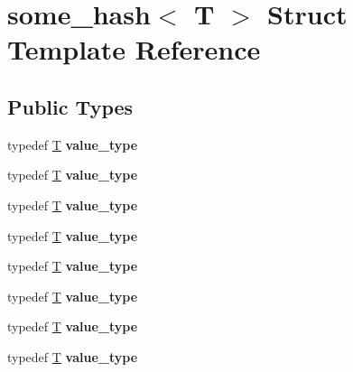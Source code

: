 \hypertarget{structsome__hash}{}\section{some\+\_\+hash$<$ T $>$ Struct Template Reference}
\label{structsome__hash}
\subsection*{Public Types}
\begin{DoxyCompactItemize}
\item 
\mbox{\label{structsome__hash_a4e2d8cd22f7cca04af3fa2c2e0dd1509}} 
typedef \mbox{\hyperlink{struct_t}{T}} {\bfseries value\+\_\+type}
\item 
\mbox{\label{structsome__hash_a4e2d8cd22f7cca04af3fa2c2e0dd1509}} 
typedef \mbox{\hyperlink{struct_t}{T}} {\bfseries value\+\_\+type}
\item 
\mbox{\label{structsome__hash_a4e2d8cd22f7cca04af3fa2c2e0dd1509}} 
typedef \mbox{\hyperlink{struct_t}{T}} {\bfseries value\+\_\+type}
\item 
\mbox{\label{structsome__hash_a4e2d8cd22f7cca04af3fa2c2e0dd1509}} 
typedef \mbox{\hyperlink{struct_t}{T}} {\bfseries value\+\_\+type}
\item 
\mbox{\label{structsome__hash_a4e2d8cd22f7cca04af3fa2c2e0dd1509}} 
typedef \mbox{\hyperlink{struct_t}{T}} {\bfseries value\+\_\+type}
\item 
\mbox{\label{structsome__hash_a4e2d8cd22f7cca04af3fa2c2e0dd1509}} 
typedef \mbox{\hyperlink{struct_t}{T}} {\bfseries value\+\_\+type}
\item 
\mbox{\label{structsome__hash_a4e2d8cd22f7cca04af3fa2c2e0dd1509}} 
typedef \mbox{\hyperlink{struct_t}{T}} {\bfseries value\+\_\+type}
\item 
\mbox{\label{structsome__hash_a4e2d8cd22f7cca04af3fa2c2e0dd1509}} 
typedef \mbox{\hyperlink{struct_t}{T}} {\bfseries value\+\_\+type}
\item 
\mbox{\label{structsome__hash_a4e2d8cd22f7cca04af3fa2c2e0dd1509}} 

\end{DoxyCompactItemize}
